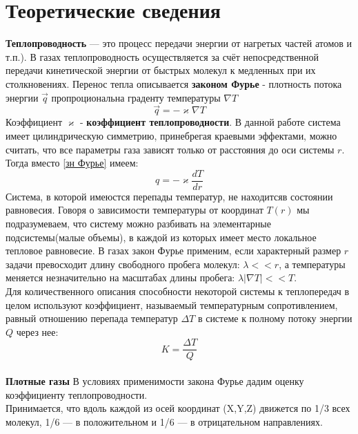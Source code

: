 \documentclass[12pt]{article}
\begin{document}
    \section{Теоретические сведения}  
        \textbf{Теплопроводность} — это процесс передачи энергии от нагретых частей атомов и т.п.). В газах теплопроводность осуществляется за 
        счёт непосредственной передачи кинетической энергии от быстрых молекул к медленных при их столкновениях. Перенос тепла 
        описывается \textbf{законом Фурье} - плотность потока энергии $\vec{q}$ пропроциональна граденту температуры $\nabla T$
        \begin{equation}\label{зн Фурье}
            \vec{q} = - \varkappa \nabla T
        \end{equation}
        Коэффициент $\varkappa$ - \textbf{коэффициент теплопроводности}. В данной работе система имеет цилиндрическую симметрию, принебрегая краевыми эффектами,
        можно считать, что все параметры газа зависят только от расстояния до оси системы $r$. Тогда вместо \ref{зн Фурье} имеем:
        \begin{equation}
            q = - \varkappa \frac{dT}{dr}
        \end{equation}
        Система, в которой имеюстся перепады температур, не находитсяв состоянии равновесия. Говоря о зависимости температуры от координат $T(r)$ мы подразумеваем, что систему
        можно разбивать на элементарные подсистемы(малые объемы), в каждой из которых имеет место локальное тепловое равновесие. В газах 
        закон Фурье применим, если характерный размер $r$ задачи превосходит длину свободного пробега молекул: $\lambda << r$, а температуры меняется незначительно на масштабах 
        длины пробега: $\lambda|\nabla T| << T$.\\
        Для количественного описания способности некоторой системы к теплопередач в целом используют коэффициент, называемый температурным сопротивлением, 
        равный отношению перепада температур $\Delta T$ в системе к полному потоку энергии $Q$ через нее:
        \begin{equation}\label{q = }
            K = \frac{\Delta T}{Q}
        \end{equation}\\
        \textbf{Плотные газы} В условиях применимости закона Фурье дадим оценку коэффициенту теплопроводности.\\
        Принимается, что вдоль каждой из осей координат (X,Y,Z) движется по 1/3 всех молекул, 1/6 — в положительном 
        и 1/6 — в отрицательном направлениях.\\
\end{document}
